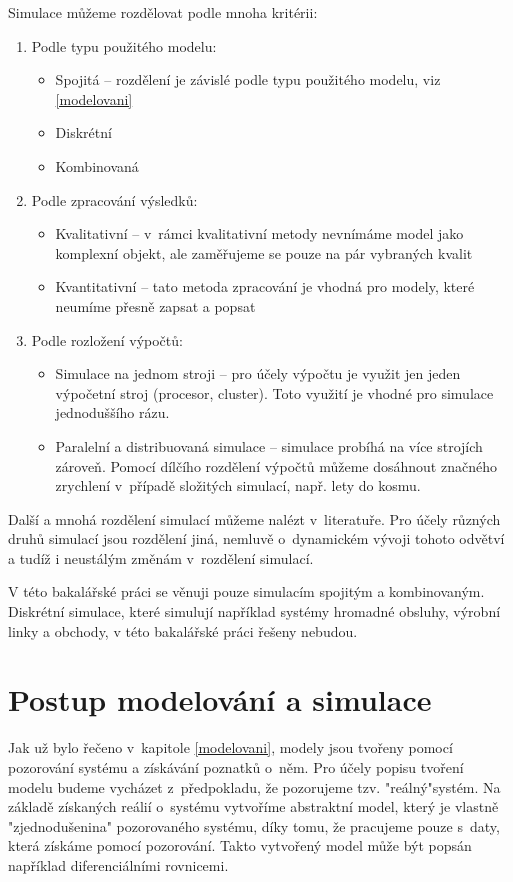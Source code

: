 Simulace můžeme rozdělovat podle mnoha kritérii:
\begin{enumerate}
    \item Podle typu použitého modelu:
        \begin{itemize}
            \item Spojitá -- rozdělení je závislé podle typu použitého modelu, viz \ref{modelovani}
            \item Diskrétní
            \item Kombinovaná
        \end{itemize}
    \item Podle zpracování výsledků:
        \begin{itemize}
            \item Kvalitativní -- v~rámci kvalitativní metody nevnímáme model jako komplexní objekt, ale zaměřujeme se pouze na pár vybraných kvalit
            \item Kvantitativní -- tato metoda zpracování je vhodná pro modely, které neumíme přesně zapsat a popsat
        \end{itemize}
    \item Podle rozložení výpočtů:
        \begin{itemize}
            \item Simulace na jednom stroji -- pro účely výpočtu je využit jen jeden výpočetní stroj (procesor, cluster). Toto využití je vhodné pro simulace jednoduššího rázu.
            \item Paralelní a distribuovaná simulace -- simulace probíhá na více strojích zároveň. Pomocí dílčího rozdělení výpočtů můžeme dosáhnout značného zrychlení v~případě složitých simulací, např. lety do kosmu.
        \end{itemize}
\end{enumerate}
Další a mnohá rozdělení simulací můžeme nalézt v~literatuře. Pro účely různých druhů simulací jsou rozdělení jiná, nemluvě o~dynamickém vývoji tohoto odvětví a tudíž i neustálým změnám v~rozdělení simulací.

V této bakalářské práci se věnuji pouze simulacím spojitým a kombinovaným. Diskrétní simulace, které simulují například systémy hromadné obsluhy, výrobní linky a obchody, v této bakalářské práci řešeny nebudou. 

\section{Postup modelování a simulace}
Jak už bylo řečeno v~kapitole \ref{modelovani}, modely jsou tvořeny pomocí pozorování systému a získávání poznatků o~něm. Pro účely popisu tvoření modelu budeme vycházet z~předpokladu, že pozorujeme tzv. "reálný"\space systém. Na základě získaných reálií o~systému vytvoříme abstraktní model, který je vlastně "zjednodušenina" pozorovaného systému, díky tomu, že pracujeme pouze s~daty, která získáme pomocí pozorování. Takto vytvořený model může být popsán například diferenciálními rovnicemi.

